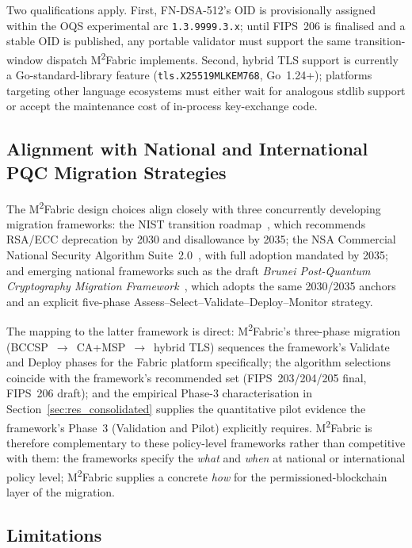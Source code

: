 \documentclass{ieeetj}
\newcommand{\mfabric}{M\textsuperscript{2}Fabric}
\begin{document}
Two qualifications apply. First, FN-DSA-512's OID is provisionally assigned
within the OQS experimental arc \texttt{1.3.9999.3.x}; until FIPS~206 is
finalised and a stable OID is published, any portable validator must support
the same transition-window dispatch \mfabric{} implements. Second, hybrid
TLS support is currently a Go-standard-library feature
(\texttt{tls.X25519MLKEM768}, Go~1.24+); platforms targeting other language
ecosystems must either wait for analogous stdlib support or accept the
maintenance cost of in-process key-exchange code.

\subsection{Alignment with National and International PQC Migration Strategies}
\label{sec:disc_policy}

The \mfabric{} design choices align closely with three concurrently
developing migration frameworks: the NIST transition
roadmap~\cite{nist_ir8547}, which recommends RSA/ECC deprecation by 2030
and disallowance by 2035; the NSA Commercial National Security Algorithm
Suite~2.0~\cite{nsa_cnsa2}, with full adoption mandated by 2035; and
emerging national frameworks such as the draft \emph{Brunei
Post-Quantum Cryptography Migration Framework}~\cite{csb_brunei2026}, which
adopts the same 2030/2035 anchors and an explicit five-phase
Assess--Select--Validate--Deploy--Monitor strategy.

The mapping to the latter framework is direct: \mfabric{}'s three-phase
migration (BCCSP~$\to$~CA+MSP~$\to$~hybrid TLS) sequences the framework's
Validate and Deploy phases for the Fabric platform specifically; the
algorithm selections coincide with the framework's recommended set
(FIPS~203/204/205 final, FIPS~206 draft); and the empirical Phase-3
characterisation in Section~\ref{sec:res_consolidated} supplies the
quantitative pilot evidence the framework's Phase~3 (Validation and Pilot)
explicitly requires. \mfabric{} is therefore complementary to these
policy-level frameworks rather than competitive with them: the frameworks
specify the \emph{what} and \emph{when} at national or international
policy level; \mfabric{} supplies a concrete \emph{how} for the
permissioned-blockchain layer of the migration.

\subsection{Limitations}
\label{sec:disc_limits}
\end{document}
